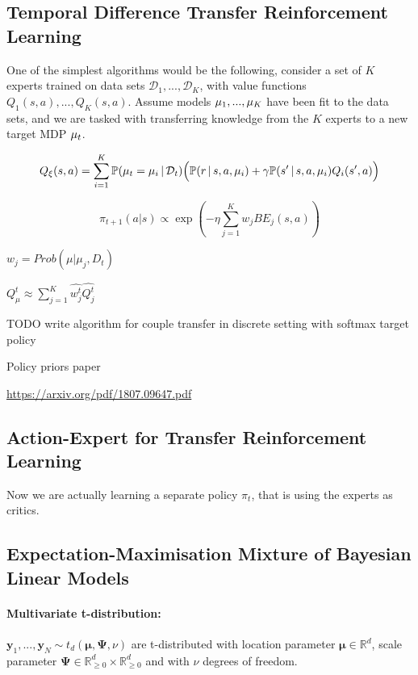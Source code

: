 \iffalse

\subsection{Temporal Difference Transfer Reinforcement Learning}

One of the simplest algorithms would be the following, consider a set of $K$ experts trained on data sets $\mathcal{D}_1, ..., \mathcal{D}_K$, with value functions $Q_1(s,a), ..., Q_K(s,a)$. Assume models $\mu_1, ..., \mu_K$ have been fit to the data sets, and we are tasked with transferring knowledge from the $K$ experts to a new target MDP $\mu_t$.

\begin{equation}
    Q_\xi(s,a) = \sum_{i=1}^K \mathbb{P}(\mu_t = \mu_i \, | \, \mathcal{D}_t) \Big(\mathbb{P}(r \, | \, s, a, \mu_i) + \gamma \mathbb{P}(s' \, | \, s, a, \mu_i)Q_i(s',a)\Big)
\end{equation}


\begin{equation}
    \pi_{t+1}(a|s) \propto \exp\left(- \eta \sum_{j=1}^K w_j BE_j(s,a) \right)
\end{equation}

$w_j = Prob(\mu|\mu_j, D_t)$

$Q_\mu^t \approx \sum_{j=1}^K \hat{w_j^t} \hat{Q_j^t}$

TODO write algorithm for couple transfer in discrete setting with softmax target policy

Policy priors paper

\url{https://arxiv.org/pdf/1807.09647.pdf}

\subsection{Action-Expert for Transfer Reinforcement Learning}

Now we are actually learning a separate policy $\pi_t$, that is using the experts as critics.

\subsection{Expectation-Maximisation Mixture of Bayesian Linear Models}

\paragraph{Multivariate t-distribution:}
$\bm{y}_1, ..., \bm{y}_N \sim t_d(\bm{\mu}, \mathbf{\Psi}, \nu)$ are t-distributed with location parameter $\bm{\mu} \in \mathbb{R}^d$, scale parameter $\mathbf{\Psi} \in \mathbb{R}_{\geq 0}^d \times \mathbb{R}_{\geq 0}^d$ and with $\nu$ degrees of freedom.

